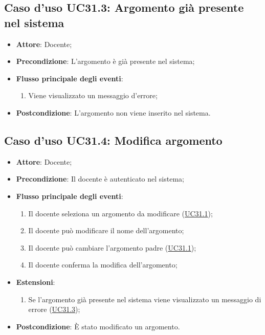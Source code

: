 \documentclass[12pt,a4paper]{article}
\begin{document}
\subsection{Caso d'uso UC31.3: Argomento già presente nel sistema}

\begin{itemize}

\item \textbf{Attore}: Docente; 
\item \textbf{Precondizione}: L'argomento è già presente nel sistema;

\item \textbf{Flusso principale degli eventi}:
\begin{enumerate}
	\item Viene visualizzato un messaggio d'errore;
	
\end{enumerate}
\item \textbf{Postcondizione}: L'argomento non viene inserito nel sistema.
\end{itemize}
\hypertarget{UC31.4}{}
\subsection{Caso d'uso UC31.4: Modifica argomento}

\begin{itemize}

\item \textbf{Attore}: Docente; 
\item \textbf{Precondizione}: Il docente è autenticato nel sistema;

\item \textbf{Flusso principale degli eventi}:
\begin{enumerate}
	\item Il docente seleziona un argomento da modificare (\hyperlink{UC31.1}{UC31.1});
	\item Il docente può modificare il nome dell'argomento;
	\item Il docente può cambiare l'argomento padre (\hyperlink{UC31.1}{UC31.1});
	\item Il docente conferma la modifica dell'argomento;
	
\end{enumerate}
\item \textbf{Estensioni}:
\begin{enumerate}
	\item Se l'argomento già presente nel sistema viene visualizzato un messaggio di errore (\hyperlink{UC31.3}{UC31.3});
	
\end{enumerate}
\item \textbf{Postcondizione}: È stato modificato un argomento.
\end{itemize}
\hypertarget{UC31.5}{}
\end{document}
